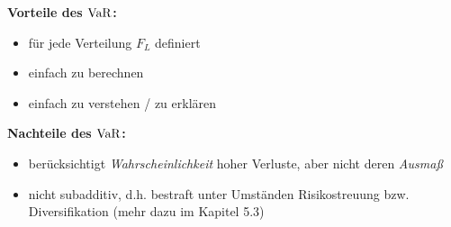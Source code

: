 \textbf{Vorteile des $\operatorname{VaR}$:}
\begin{itemize}[nolistsep, topsep=-\parskip]
	\item für jede Verteilung $F_L$ definiert
	\item einfach zu berechnen
	\item einfach zu verstehen / zu erklären
\end{itemize}

\textbf{Nachteile des $\operatorname{VaR}$:}
\begin{itemize}[nolistsep, topsep=-\parskip]
	\item berücksichtigt \textit{Wahrscheinlichkeit} hoher Verluste, aber nicht deren \textit{Ausmaß}
	\item nicht subadditiv, d.h. bestraft unter Umständen Risikostreuung bzw. Diversifikation (mehr dazu im Kapitel 5.3)
\end{itemize}

